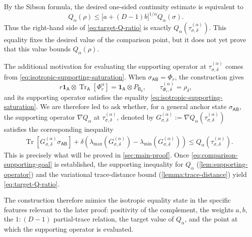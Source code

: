 \documentclass[11pt,reqno]{amsart}
\theoremstyle{definition}
\DeclareMathOperator{\Tr}{Tr}
\newcommand{\I}{\mathbf 1}
\newcommand{\A}{\mathsf{A}}
\newcommand{\B}{\mathsf{B}}
\begin{document}
By the Sibson formula, the desired one-sided continuity estimate is
equivalent to
\begin{equation}\label{eq:target-Q-ratio}
	Q_\alpha(\rho)
	\leq
	\bigl[a+(D-1)b\bigr]^{1/\alpha}
	Q_\alpha(\sigma).
\end{equation}
Thus the right-hand side of \cref{eq:target-Q-ratio} is exactly
$Q_\alpha(\tau_{\sigma,\delta}^{(\alpha)})$.  This equality fixes the
desired value of the comparison point, but it does not yet prove that this
value bounds $Q_\alpha(\rho)$.

The additional motivation for evaluating the supporting operator at
$\tau_{\sigma,\delta}^{(\alpha)}$ comes from
\cref{eq:isotropic-supporting-saturation}.  When
$\sigma_{\A\B}=\Phi_r$, the construction gives
\begin{equation}\label{eq:comparison-recovers-isotropic}
	r\I_{\A}\otimes\Tr_{\A}[\Phi_r^\alpha]
	=
	\I_{\A}\otimes P_{\B_0},
	\qquad
	\tau_{\Phi_r,\delta}^{(\alpha)}
	=
	\rho_\delta,
\end{equation}
and its supporting operator satisfies the equality
\cref{eq:isotropic-supporting-saturation}.  We are therefore led to ask
whether, for a general anchor state $\sigma_{\A\B}$, the supporting operator $\nabla Q_{\alpha}$ at
$\tau_{\sigma,\delta}^{(\alpha)}$, denoted by $G_{\sigma,\delta}^{(\alpha)} := \nabla Q_{\alpha}(\tau_{\sigma,\delta}^{(\alpha)})$ satisfies the corresponding inequality
\begin{align}
	&\Tr\!\left[
	G_{\sigma,\delta}^{(\alpha)}\sigma_{\A\B}
	\right]
	+\delta\left(
	\lambda_{\max}
	\left(G_{\sigma,\delta}^{(\alpha)}\right)
	-
	\lambda_{\min}
	\left(G_{\sigma,\delta}^{(\alpha)}\right)
	\right)
	\leq
	Q_\alpha(\tau_{\sigma,\delta}^{(\alpha)}).
	\label{eq:comparison-supporting-goal}
\end{align}
This is precisely what will be proved in \cref{sec:main-proof}.  Once
\cref{eq:comparison-supporting-goal} is established, the supporting
inequality for $Q_\alpha$ (\cref{lem:supporting-operator}) and the variational trace-distance bound (\cref{lemma:trace-distance}) yield
\cref{eq:target-Q-ratio}.

The construction therefore mimics the isotropic equality state in the
specific features relevant to the later proof: positivity of the
complement, the weights $a,b$, the $1:(D-1)$ partial-trace relation, the
target value of $Q_\alpha$, and the point at which the supporting operator
is evaluated. 
\end{document}
